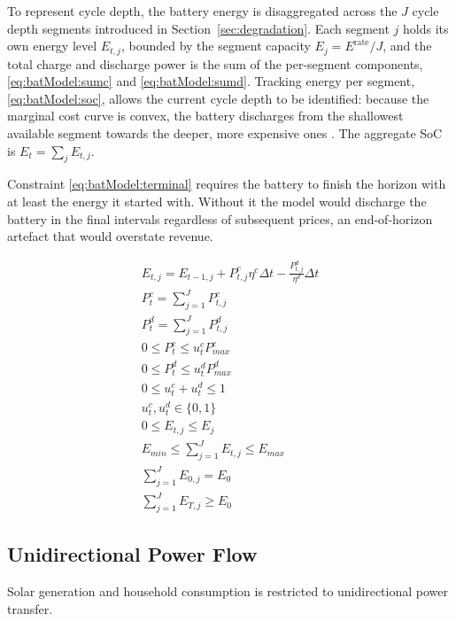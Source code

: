To represent cycle depth, the battery energy is disaggregated across the $J$ cycle depth segments introduced in Section~\ref{sec:degradation}. Each segment $j$ holds its own energy level $E_{t,j}$, bounded by the segment capacity $E_j = E^{\text{rate}}/J$, and the total charge and discharge power is the sum of the per-segment components, \eqref{eq:batModel:sumc} and \eqref{eq:batModel:sumd}. Tracking energy per segment, \eqref{eq:batModel:soc}, allows the current cycle depth to be identified: because the marginal cost curve is convex, the battery discharges from the shallowest available segment towards the deeper, more expensive ones \cite{Xu2018}. The aggregate SoC is $E_t = \sum_j E_{t,j}$.

Constraint \ref{eq:batModel:terminal} requires the battery to finish the horizon with at least the energy it started with. Without it the model would discharge the battery in the final intervals regardless of subsequent prices, an end-of-horizon artefact that would overstate revenue.

\begin{subequations}
\label{eq:cons:batModel}
  \begin{align}
      E_{t,j} = E_{t-1,j} + P^c_{t,j} \eta^c \Delta t
      - \frac{P^d_{t,j}}{\eta^d} \Delta t \label{eq:batModel:soc}\\
      P^c_t = \sum_{j=1}^{J} P^c_{t,j} \label{eq:batModel:sumc} \\
      P^d_t = \sum_{j=1}^{J} P^d_{t,j} \label{eq:batModel:sumd} \\
      0 \leq P^c_t \leq u^c_t P^c_{max} \label{eq:batModel:charge} \\
      0 \leq P^d_t \leq u^d_t P^d_{max} \label{eq:batModel:discharge}\\
      0 \leq u^c_t + u^d_t \leq 1 \\
      u^c_t, u^d_t \in \{0,1\} \\
      0 \leq E_{t,j} \leq E_j \label{eq:batModel:segbound} \\
      E_{min} \leq \sum_{j=1}^{J} E_{t,j} \leq E_{max} \label{eq:batModel:bound} \\
      \sum_{j=1}^{J} E_{0,j} = E_0  \label{eq:batModel:initial} \\
      \sum_{j=1}^{J} E_{T,j} \geq E_0  \label{eq:batModel:terminal}
  \end{align}
\end{subequations}

\subsection{Unidirectional Power Flow}
Solar generation and household consumption is restricted to unidirectional power transfer.


